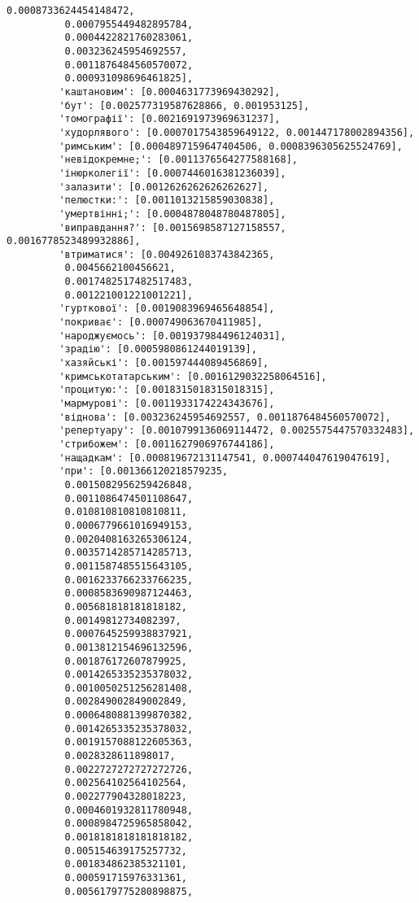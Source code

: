 \documentclass[11pt]{article}
\begin{document}
\begin{Verbatim}[commandchars=\\\{\}]
          0.0008733624454148472,
          0.0007955449482895784,
          0.0004422821760283061,
          0.003236245954692557,
          0.0011876484560570072,
          0.000931098696461825],
         'каштановим': [0.0004631773969430292],
         'бут': [0.002577319587628866, 0.001953125],
         'томографії': [0.0021691973969631237],
         'худорлявого': [0.0007017543859649122, 0.001447178002894356],
         'римським': [0.0004897159647404506, 0.0008396305625524769],
         'невідокремне;': [0.0011376564277588168],
         'інюрколегії': [0.0007446016381236039],
         'залазити': [0.0012626262626262627],
         'пелюстки:': [0.0011013215859030838],
         'умертвінні;': [0.0004878048780487805],
         'виправдання?': [0.0015698587127158557, 0.0016778523489932886],
         'втриматися': [0.0049261083743842365,
          0.0045662100456621,
          0.0017482517482517483,
          0.001221001221001221],
         'гурткової': [0.0019083969465648854],
         'покриває': [0.000749063670411985],
         'народжуємось': [0.001937984496124031],
         'зрадію': [0.0005980861244019139],
         'хазяйські': [0.001597444089456869],
         'кримськотатарським': [0.0016129032258064516],
         'процитую:': [0.0018315018315018315],
         'мармурові': [0.0011933174224343676],
         'віднова': [0.003236245954692557, 0.0011876484560570072],
         'репертуару': [0.0010799136069114472, 0.0025575447570332483],
         'стрибожем': [0.0011627906976744186],
         'нащадкам': [0.000819672131147541, 0.000744047619047619],
         'при': [0.001366120218579235,
          0.0015082956259426848,
          0.0011086474501108647,
          0.010810810810810811,
          0.0006779661016949153,
          0.0020408163265306124,
          0.0035714285714285713,
          0.0011587485515643105,
          0.0016233766233766235,
          0.0008583690987124463,
          0.005681818181818182,
          0.00149812734082397,
          0.0007645259938837921,
          0.0013812154696132596,
          0.001876172607879925,
          0.0014265335235378032,
          0.0010050251256281408,
          0.002849002849002849,
          0.0006480881399870382,
          0.0014265335235378032,
          0.0019157088122605363,
          0.0028328611898017,
          0.0022727272727272726,
          0.002564102564102564,
          0.002277904328018223,
          0.0004601932811780948,
          0.0008984725965858042,
          0.0018181818181818182,
          0.005154639175257732,
          0.001834862385321101,
          0.000591715976331361,
          0.0056179775280898875,

\end{Verbatim}
\end{document}
